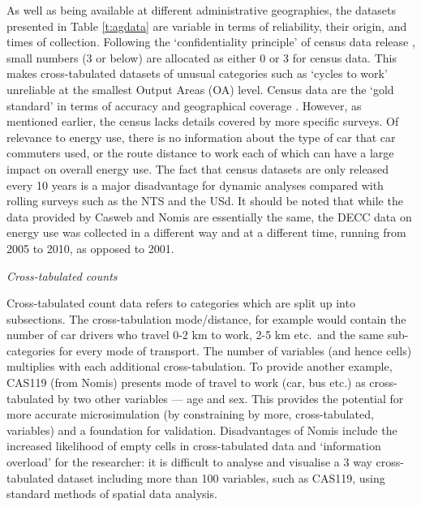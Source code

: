 \documentclass[a4paper, 11pt, twoside]{Thesis}
\begin{document}
As well as being available at different administrative geographies, the datasets
presented in Table \ref{t:agdata} are variable in terms of reliability, their
origin, and times of collection.
Following the `confidentiality principle' of
census data release \citep{Rees2002}, small numbers (3 or below) are allocated
as either 0 or 3 for census data.
This makes cross-tabulated datasets of unusual categories such as `cycles to
work' unreliable at the smallest Output Areas (OA) level.
Census data are the `gold standard' in terms of accuracy
and geographical coverage \citep[p.~4]{Martin2002}.
However, as mentioned earlier, the census lacks details covered by more
specific surveys. Of relevance to energy use, there is no information about the
type of car that car commuters used, or the route distance to work each of
which can have a large impact on overall energy use. The fact that census datasets
are only released every 10 years is a major disadvantage for dynamic analyses
compared with rolling surveys such as the NTS and the USd. It should be noted
that while the data provided by Casweb and Nomis are essentially the same,
the DECC data on energy use was collected in a different way and at a different
time, running from 2005 to 2010, as opposed to 2001.

\emph{Cross-tabulated counts}

Cross-tabulated count data refers to categories which are split up into
subsections. The cross-tabulation mode/distance, for example would contain the
number of car drivers who travel 0-2 km to work, 2-5 km etc.~and the same
sub-categories for every mode of transport. The number of variables (and hence
cells) multiplies with each additional cross-tabulation. To provide another
example, CAS119 (from Nomis) presents mode of travel to work (car, bus etc.) as
cross-tabulated by two other variables --- age and sex.
This provides the potential for more accurate microsimulation (by constraining
by more, cross-tabulated, variables) and a foundation for
validation. Disadvantages of Nomis include the increased likelihood of
empty cells in cross-tabulated data
and `information overload' for the researcher: it is difficult to analyse and
visualise a 3 way cross-tabulated dataset including more than 100 variables,
such as CAS119, using standard methods of spatial data analysis.
\end{document}
